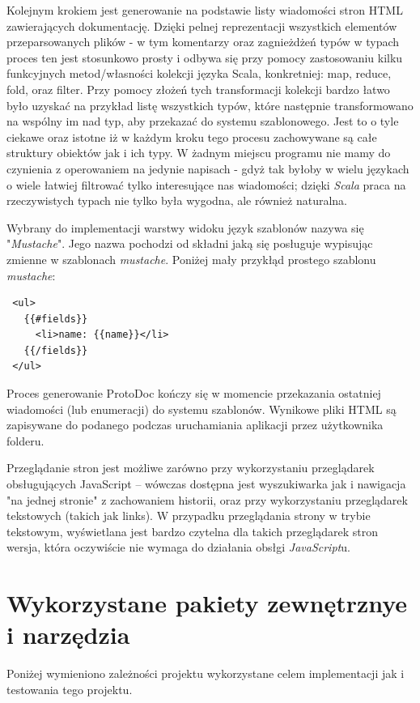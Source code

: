 \documentclass[a4paper]{article}
\begin{document}
Kolejnym krokiem jest generowanie na podstawie listy wiadomości stron HTML zawierających dokumentację. Dzięki pelnej reprezentacji wszystkich elementów 
przeparsowanych plików - w tym komentarzy oraz zagnieżdżeń typów w typach proces ten jest stosunkowo prosty i odbywa się przy pomocy zastosowaniu
kilku funkcyjnych metod/własności kolekcji języka Scala, konkretniej: map, reduce, fold, oraz filter. Przy pomocy złożeń tych transformacji kolekcji bardzo łatwo było
uzyskać na przykład listę wszystkich typów, które następnie transformowano na wspólny im nad typ, aby przekazać do systemu szablonowego.  
Jest to o tyle ciekawe oraz istotne iż w każdym kroku tego procesu zachowywane są całe struktury obiektów jak i ich typy. W żadnym miejscu programu nie mamy 
do czynienia z operowaniem na jedynie napisach - gdyż tak byłoby w wielu językach o wiele łatwiej filtrować tylko interesujące nas wiadomości; dzięki \textit{Scala}
praca na rzeczywistych typach nie tylko była wygodna, ale również naturalna.

\newpage
Wybrany do implementacji warstwy widoku język szablonów nazywa się "\textit{Mustache}". Jego nazwa pochodzi od składni jaką się posługuje wypisując zmienne w szablonach
\textit{mustache}. Poniżej mały przykłąd prostego szablonu \textit{mustache}:
\begin{verbatim}
 <ul>
   {{#fields}}
     <li>name: {{name}}</li>
   {{/fields}}
 </ul>
\end{verbatim}
Proces generowanie ProtoDoc kończy się w momencie przekazania ostatniej wiadomości (lub enumeracji) do systemu szablonów. 
Wynikowe pliki HTML są zapisywane do podanego podczas uruchamiania aplikacji przez użytkownika folderu. 

Przeglądanie stron jest możliwe zarówno przy wykorzystaniu przeglądarek obsługujących JavaScript -- wówczas dostępna jest wyszukiwarka jak i nawigacja 
"na jednej stronie" z zachowaniem historii, oraz przy wykorzystaniu przeglądarek tekstowych (takich jak links). W przypadku przeglądania strony w trybie tekstowym,
wyświetlana jest bardzo czytelna dla takich przeglądarek stron wersja, która oczywiście nie wymaga do działania obsłgi \textit{JavaScript}u. 


\section{Wykorzystane pakiety zewnętrznye i narzędzia}
Poniżej wymieniono zależności projektu wykorzystane celem implementacji jak i testowania tego projektu.
\end{document}
